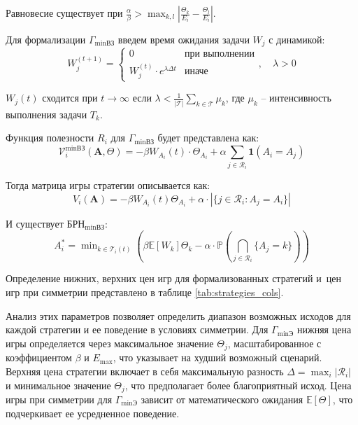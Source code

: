Равновесие существует при $\frac{\alpha}{\beta} > \max_{k,l} \left| \frac{\Theta_k}{E_i} - \frac{\Theta_l}{E_i} \right|$.

Для формализации $\Gamma_{\min\text{ВЗ}}$ введем время ожидания задачи $W_j$ с динамикой:
\begin{equation}
	\label{eq:time_ntts_time}
	W_j^{(t+1)} = \begin{cases}
		0 & \text{при выполнении} \\
		W_j^{(t)} \cdot e^{\lambda \Delta t} & \text{иначе}
	\end{cases}, \quad \lambda > 0
\end{equation}

$W_j(t)$ сходится при $t \to \infty$ если $\lambda < \frac{1}{|\mathcal{T}|} \sum_{k \in \mathcal{T}} \mu_k$, где $\mu_k$ -- интенсивность выполнения задачи \(T_k\).

Функция полезности $R_i$ для $\Gamma_{\min\text{ВЗ}}$ будет представлена как:
\begin{equation}
	\label{eq:usefulness_ntts_time}
	\mathcal{V}_i^{\mathrm{\min}\text{ВЗ}}(\mathbf{A}, \Theta) = -\beta W_{A_i}(t) \cdot \Theta_{A_i} + \alpha \sum_{j \in \mathcal{R}_i} \mathbf{1}(A_i = A_j)
\end{equation}

Тогда матрица игры стратегии описывается как:
\begin{equation}
	\label{eq:matrix_ntts_time}
	V_i(\mathbf{A}) = -\beta W_{A_i}(t) \Theta_{A_i} + \alpha \cdot |\{ j \in \mathcal{R}_i : A_j = A_i \}|
\end{equation}

И существует $\text{БРН}_{\min\text{ВЗ}}$:
\begin{equation}
	A_i^* = \mathrm{\min}_{k \in \mathcal{T}_i(t)} \left( \beta \mathbb{E}[W_k] \Theta_k - \alpha \cdot \mathbb{P}\left( \bigcap_{j \in \mathcal{R}_i} \{ A_j = k \} \right) \right)
\end{equation}

Определение нижних, верхних цен игр для формализованных стратегий и~цен игр при симметрии представлено в таблице \ref{tab:strategies_cols}.

Анализ этих параметров позволяет определить диапазон возможных исходов для каждой стратегии и ее поведение в условиях симметрии. Для $\Gamma_{\min\text{Э}}$ нижняя цена игры определяется через максимальное значение $\Theta_j$, масштабированное с коэффициентом $\beta$ и $E_{\text{max}}$, что указывает на худший возможный сценарий. Верхняя цена стратегии включает в себя максимальную разность $\Delta = \max_i |\mathcal{R}_i|$ и минимальное значение $\Theta_j$, что предполагает более благоприятный исход. Цена игры при симметрии для $\Gamma_{\min\text{Э}}$ зависит от математического ожидания $\mathbb{E}[\Theta]$, что подчеркивает ее усредненное поведение.


